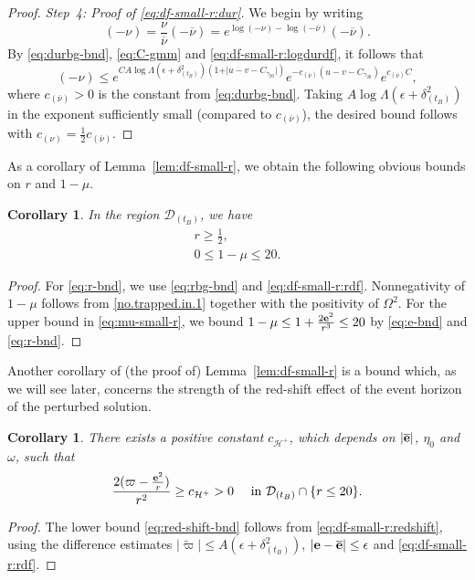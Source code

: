 \documentclass[10pt, reqno]{amsart}
\newtheorem{corollary}[theorem]{Corollary}
\theoremstyle{definition}
\theoremstyle{remark}
\theoremstyle{conjecture}
\numberwithin{equation}{section}
\newcommand{\abs}[1]{\vert#1\vert}
\newcommand{\set}[1]{\{#1\}}
\newcommand{\0}{\emptyset}
\newcommand{\gmm}{\gamma}
\newcommand{\dlt}{\delta}
\newcommand{\eps}{\epsilon}
\newcommand{\Lmb}{\Lambda}
\newcommand{\omg}{\omega}
\newcommand{\Omg}{\Omega}
\newcommand{\bfe}{{\bf e}}
\newcommand{\calD}{\mathcal D}
\newcommand{\calH}{\mathcal H}
\newcommand{\dur}{\nu}
\newcommand{\EH}{\calH^{+}}
\newcommand{\pfstep}[1]{\vspace{.5em} {\it \noindent #1.}}
\newcommand{\e}{\bfe}							%
\newcommand{\durbg}{\overline{\dur}}				%
\newcommand{\varpibg}{\overline{\varpi}}				%
\newcommand{\ebg}{\overline{\e}}					%
\newcommand{\varpidf}{\widetilde{\varpi}}				%
\begin{document}
\begin{proof}
\pfstep{Step~4: Proof of \eqref{eq:df-small-r:dur}} 
We begin by writing
\begin{equation*}
	(-\dur) 
	= \frac{\dur}{\durbg}  (-\durbg)
	= e^{\log(-\dur) - \log(-\durbg)} (-\durbg).
\end{equation*}
By \eqref{eq:durbg-bnd}, \eqref{eq:C-gmm} and \eqref{eq:df-small-r:logdurdf}, it follows that
\begin{equation*}
	(-\dur) \leq e^{C A \log \Lmb (\eps + \dlt_{(t_{B})}^{2}) (1 + \abs{u - v - C_{\gmm_{20}}})}e^{ - c_{(\durbg)} (u - v - C_{\gmm_{20}})} e^{ c_{(\durbg)} C},
\end{equation*}
where $c_{(\durbg)} > 0$ is the constant from \eqref{eq:durbg-bnd}. Taking $A \log \Lmb (\eps + \dlt_{(t_{B})}^{2})$ in the exponent sufficiently small (compared to $c_{(\durbg)}$), the desired bound follows with $c_{(\dur)} = \frac{1}{2} c_{(\durbg)}$. \qedhere
\end{proof}

As a corollary of Lemma~\ref{lem:df-small-r}, we obtain the following obvious bounds on $r$ and $1-\mu$.
\begin{corollary} \label{cor:small-r}
In the region $\calD_{(t_{B})}$, we have
\begin{gather} 
	r \geq \frac{1}{2}, \label{eq:r-bnd} \\
	0 \leq 1-\mu \leq 20. \label{eq:mu-small-r}
\end{gather}
\end{corollary}
\begin{proof}
For \eqref{eq:r-bnd}, we use \eqref{eq:rbg-bnd} and \eqref{eq:df-small-r:rdf}. Nonnegativity of $1-\mu$ follows from \eqref{no.trapped.in.1} together with the positivity of $\Omg^2$. For the upper bound in \eqref{eq:mu-small-r}, we bound $1-\mu \leq 1 + \frac{2 \e^{2}}{r^{3}} \leq 20$ by \eqref{eq:e-bnd} and \eqref{eq:r-bnd}. \qedhere
\end{proof}

Another corollary of (the proof of) Lemma~\ref{lem:df-small-r} is a bound which, as we will see later, concerns the strength of the red-shift effect of the event horizon of the perturbed solution.
\begin{corollary} \label{cor:red-shift-bnd}
There exists a positive constant $c_{\EH}$, which depends on $|\ebg|$, $\eta_0$ and $\omg$, such that
\begin{equation} \label{eq:red-shift-bnd}
	\frac{2(\varpi - \frac{\e^{2}}{r})}{r^{2}} \geq c_{\EH} > 0 \quad \hbox{ in } \calD_{(t_{B})} \cap \set{r \leq 20}.
\end{equation}
\end{corollary}
\begin{proof}
The lower bound \eqref{eq:red-shift-bnd} follows from \eqref{eq:df-small-r:redshift}, using the difference estimates $\abs{\varpidf} \leq A (\eps + \dlt_{(t_{B})}^{2})$, $\abs{\e - \ebg} \leq \eps$ and \eqref{eq:df-small-r:rdf}.  \qedhere
\end{proof}
\end{document}
